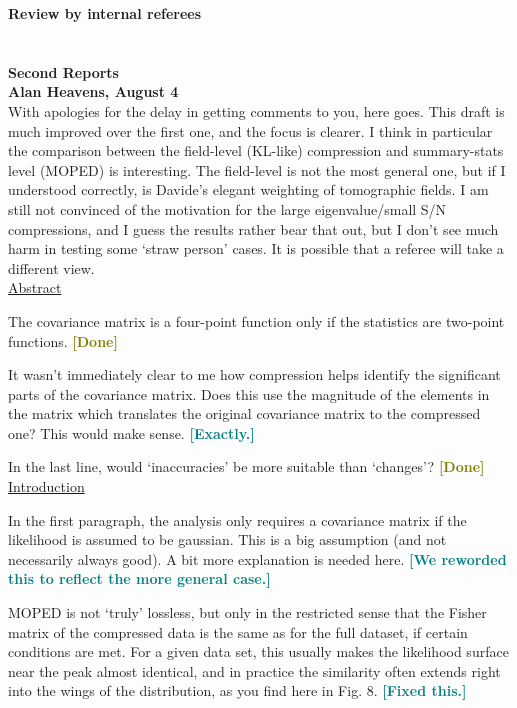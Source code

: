 \documentclass{article}
\newcommand\reply[1]{{\bf {\textcolor{teal}{[#1]}}}}
\newcommand\done{{\bf {\textcolor{olive}{[Done]}}}}
\begin{document}
	
	\pagebreak
	
	{\LARGE\textbf{Review by internal referees}}\\ \\ \\
	
	{\Large\textbf{Second Reports}}\\
	
	\textbf{Alan Heavens, August 4}\\
	
	With apologies for the delay in getting comments to you, here goes.  This draft is much improved over the first one, and the focus is clearer.  I think in particular the comparison between the field-level (KL-like) compression and summary-stats level (MOPED) is interesting.  The field-level is not the most general one, but if I understood correctly, is Davide’s elegant weighting of tomographic fields.  I am still not convinced of the motivation for the large eigenvalue/small S/N compressions, and I guess the results rather bear that out, but I don’t see much harm in testing some ‘straw person’ cases.  It is possible that a referee will take a different view.\\
	
	\underline{Abstract}
	
	The covariance matrix is a four-point function only if the statistics are two-point functions. \done
	
	It wasn’t immediately clear to me how compression helps identify the significant parts of the covariance matrix.  Does this use the magnitude of the elements in the matrix which translates the original covariance matrix to the compressed one?  This would make sense. \reply{Exactly.}
	
	In the last line, would ‘inaccuracies’ be more suitable than ‘changes’? \done\\
	
	\underline{Introduction}
	
	In the first paragraph, the analysis only requires a covariance matrix if the likelihood is assumed to be gaussian.  This is a big assumption (and not necessarily always good).  A bit more explanation is needed here. \reply{We reworded this to reflect the more general case.}
	
	MOPED is not ‘truly’ lossless, but only in the restricted sense that the Fisher matrix of the compressed data is the same as for the full dataset, if certain conditions are met.  For a given data set, this usually makes the likelihood surface near the peak almost identical, and in practice the similarity often extends right into the wings of the distribution, as you find here in Fig. 8. \reply{Fixed this.}
	
\end{document}
